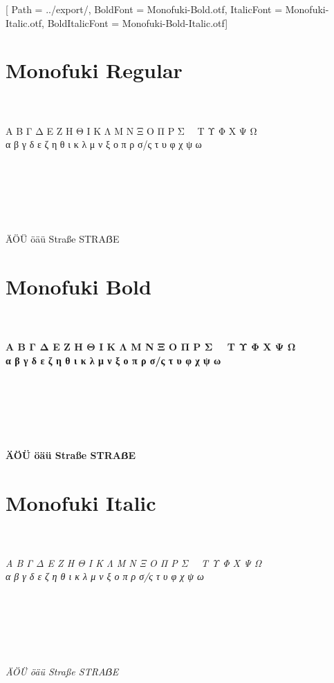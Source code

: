 \documentclass[12pt, a4paper]{article}
\begin{document}
\setmainfont{Monofuki-Regular.otf}[
Path = ../export/,
BoldFont = Monofuki-Bold.otf,
ItalicFont = Monofuki-Italic.otf,
BoldItalicFont  = Monofuki-Bold-Italic.otf]

\section*{Monofuki Regular}

\noindent\AZtext\\
\noindent\aztext\\
\noindent Α Β Γ Δ Ε Ζ Η Θ Ι Κ Λ Μ Ν Ξ Ο Π Ρ Σ~~ Τ Υ Φ Χ Ψ Ω\\
\noindent α β γ δ ε ζ η θ ι κ λ μ ν ξ ο π ρ σ/ς τ υ φ χ ψ ω\\
\noindent\digitstext\\
\noindent\punctext\\
~\\
~\\
\lipsum[0-1]
~\\
~\\
\noindent ÄÖÜ öäü Straße STRAẞE\\

\newpage

\section*{Monofuki Bold}

\noindent\textbf{%
\noindent\AZtext\\
\noindent\aztext\\
\noindent Α Β Γ Δ Ε Ζ Η Θ Ι Κ Λ Μ Ν Ξ Ο Π Ρ Σ~~ Τ Υ Φ Χ Ψ Ω\\
\noindent α β γ δ ε ζ η θ ι κ λ μ ν ξ ο π ρ σ/ς τ υ φ χ ψ ω\\
\noindent\digitstext\\
\noindent\punctext\\
~\\
~\\
\lipsum[0-1]
~\\
~\\
\noindent ÄÖÜ öäü Straße STRAẞE\\
}

\newpage

\section*{Monofuki Italic}

\noindent\textit{%
\noindent\AZtext\\
\noindent\aztext\\
\noindent Α Β Γ Δ Ε Ζ Η Θ Ι Κ Λ Μ Ν Ξ Ο Π Ρ Σ~~ Τ Υ Φ Χ Ψ Ω\\
\noindent α β γ δ ε ζ η θ ι κ λ μ ν ξ ο π ρ σ/ς τ υ φ χ ψ ω\\
\noindent\digitstext\\
\noindent\punctext\\
~\\
~\\
\lipsum[0-1]
~\\
~\\
\noindent ÄÖÜ öäü Straße STRAẞE\\
}
\end{document}
